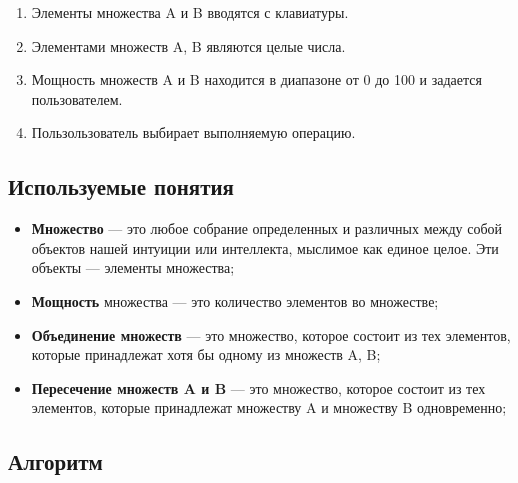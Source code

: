 \documentclass[a4paper,12pt]{extarticle}
\begin{document}
\begin{enumerate}
  \item Элементы множества A и B вводятся с клавиатуры.
  \item Элементами множеств A, B являются целые числа.
  \item Мощность множеств A и B находится в диапазоне от 0 до 100 и задается пользователем.
  \item Пользользователь выбирает выполняемую операцию.
\end{enumerate}
\begin{center}
\section*{Используемые понятия}
\end{center}
\begin{itemize}
  \item\textbf{Множество} — это любое собрание определенных и различных между собой объектов нашей интуиции или интеллекта, мыслимое как единое целое. Эти объекты — элементы множества;
  \item\textbf{Мощность} множества — это количество элементов во множестве;
  \item\textbf{Объединение множеств} — это множество, которое состоит из тех элементов, которые принадлежат хотя бы одному из множеств A, B;
  \item\textbf{Пересечение множеств A и B} — это множество, которое состоит из тех элементов, которые  принадлежат множеству A и множеству B одновременно;
\end{itemize}
\begin{center}
\section*{Алгоритм}
\end{center}
\end{document}
